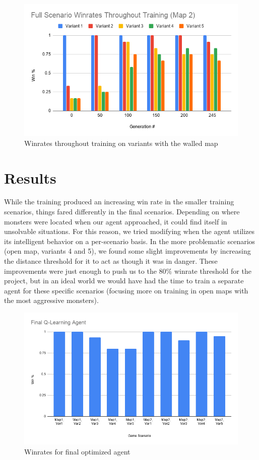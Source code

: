 \documentclass{article}
\begin{document}
\begin{figure}[h]
    \begin{minipage}{\textwidth}
      \centering
      \includegraphics[width=0.65\linewidth]{Writeup/full_wr_training_map2.png}
      \caption*{Winrates throughout training on variants with the walled map}
    \end{minipage}
\end{figure}

\section{Results}
While the training produced an increasing win rate in the smaller training scenarios, things fared differently in the final scenarios. Depending on where monsters were located when our agent approached, it could find itself in unsolvable situations. For this reason, we tried modifying when the agent utilizes its intelligent behavior on a per-scenario basis. In the more problematic scenarios (open map, variants 4 and 5), we found some slight improvements by increasing the distance threshold for it to act as though it was in danger. These improvements were just enough to push us to the 80\% winrate threshold for the project, but in an ideal world we would have had the time to train a separate agent for these specific scenarios (focusing more on training in open maps with the most aggressive monsters).

\begin{figure}[h]
    \begin{minipage}{\textwidth}
      \centering
      \includegraphics[width=0.95\linewidth]{Writeup/final_agent.png}
      \caption*{Winrates for final optimized agent}
    \end{minipage}
\end{figure}
\end{document}
